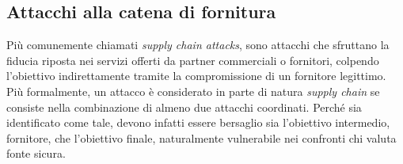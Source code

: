 \documentclass[12pt,a4paper,openright,twoside]{report}
\begin{document}
\subsection{Attacchi alla catena di fornitura}
Pi\`u comunemente  chiamati \textit{supply chain attacks}, sono attacchi che sfruttano la fiducia riposta nei servizi offerti da partner commerciali o fornitori, colpendo l'obiettivo indirettamente tramite la compromissione di un fornitore legittimo.\\
Pi\`u formalmente, un attacco \`e considerato in parte di natura \textit{supply chain} se consiste nella combinazione di almeno due attacchi coordinati. Perch\'e sia identificato come tale, devono infatti essere bersaglio sia l'obiettivo intermedio, fornitore, che l'obiettivo finale, naturalmente vulnerabile nei confronti chi valuta fonte sicura. \\
\end{document}
